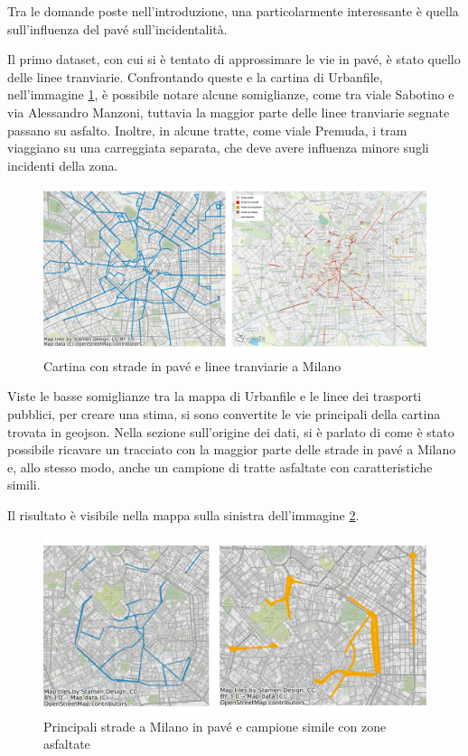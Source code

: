 \documentclass[a4paper,12pt]{report}
\begin{document}
Tra le domande poste nell'introduzione, una particolarmente interessante è quella 
sull'influenza del pavé sull'incidentalità. 

Il primo dataset, con cui si è tentato di approssimare le vie in pavé, è stato quello 
delle linee tranviarie. 
Confrontando queste e la cartina di Urbanfile, nell'immagine \ref{fig:tram-pave-milano}, 
è possibile notare alcune somiglianze, come tra viale Sabotino e via 
Alessandro Manzoni, tuttavia la maggior parte delle linee tranviarie segnate 
passano su asfalto. 
Inoltre, in alcune tratte, come viale Premuda, i tram viaggiano su una carreggiata separata, 
che deve avere influenza minore sugli incidenti della zona. 

\begin{figure}
    \includegraphics[width=\linewidth]{../src/tram/tram_milano.png}
    \caption{Cartina con strade in pavé e linee tranviarie a Milano}
    \label{fig:tram-pave-milano}
\end{figure}

Viste le basse somiglianze tra la mappa di Urbanfile e le linee dei trasporti pubblici, 
per creare una stima, si sono convertite le vie principali della cartina trovata 
in geojson. 
Nella sezione sull'origine dei dati, si è parlato di come è stato possibile ricavare 
un tracciato con la maggior parte delle strade in pavé a Milano e, allo stesso modo, 
anche un campione di tratte asfaltate con caratteristiche simili. 

Il risultato è visibile nella mappa sulla sinistra dell'immagine \ref{fig:mappa-pave}. 

\begin{figure}
    \includegraphics[width=\linewidth]{img_unite/mappa_pave_asfalto.png}
    \caption{Principali strade a Milano in pavé e campione simile con zone asfaltate}
    \label{fig:mappa-pave}
\end{figure}
\end{document}
